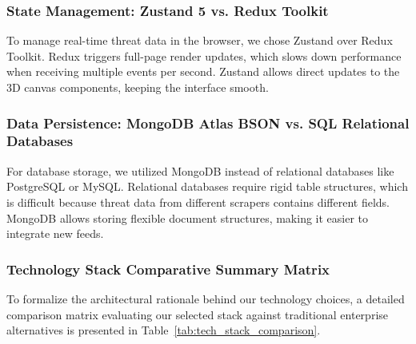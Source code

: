 \subsubsection{State Management: Zustand 5 vs. Redux Toolkit}
To manage real-time threat data in the browser, we chose Zustand over Redux Toolkit. Redux triggers full-page render updates, which slows down performance when receiving multiple events per second. Zustand allows direct updates to the 3D canvas components, keeping the interface smooth.

\subsubsection{Data Persistence: MongoDB Atlas BSON vs. SQL Relational Databases}
For database storage, we utilized MongoDB instead of relational databases like PostgreSQL or MySQL. Relational databases require rigid table structures, which is difficult because threat data from different scrapers contains different fields. MongoDB allows storing flexible document structures, making it easier to integrate new feeds.

\subsubsection{Technology Stack Comparative Summary Matrix}
To formalize the architectural rationale behind our technology choices, a detailed comparison matrix evaluating our selected stack against traditional enterprise alternatives is presented in Table~\ref{tab:tech_stack_comparison}.

